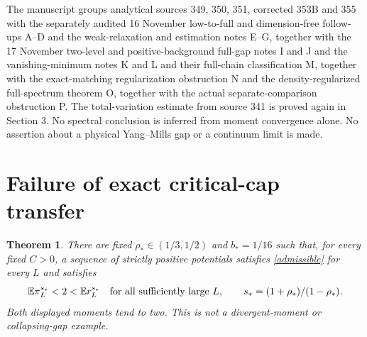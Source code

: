 \documentclass[11pt]{article}
\newcommand{\E}{\mathbb E}
\newtheorem{theorem}{Theorem}[section]
\begin{document}
The manuscript groups analytical sources 349, 350, 351, corrected 353B and 355 with the separately audited 16 November low-to-full and dimension-free follow-ups A--D and the weak-relaxation and estimation notes E--G, together with the 17 November two-level and positive-background full-gap notes I and J and the vanishing-minimum notes K and L and their full-chain classification M, together with the exact-matching regularization obstruction N and the density-regularized full-spectrum theorem O, together with the actual separate-comparison obstruction P. The total-variation estimate from source 341 is proved again in Section 3. No spectral conclusion is inferred from moment convergence alone. No assertion about a physical Yang--Mills gap or a continuum limit is made.

\section{Failure of exact critical-cap transfer}
\begin{theorem}\label{capfailure}
There are fixed $\rho_*\in(1/3,1/2)$ and $b_*=1/16$ such that, for every fixed $C>0$, a sequence of strictly positive potentials satisfies \eqref{admissible} for every $L$ and satisfies
\[
 \E\pi_L^{s_*}<2<\E r_L^{s_*}
 \quad\hbox{for all sufficiently large }L,
 \qquad s_*=(1+\rho_*)/(1-\rho_*).
\]
Both displayed moments tend to two. This is not a divergent-moment or collapsing-gap example.
\end{theorem}
\end{document}
